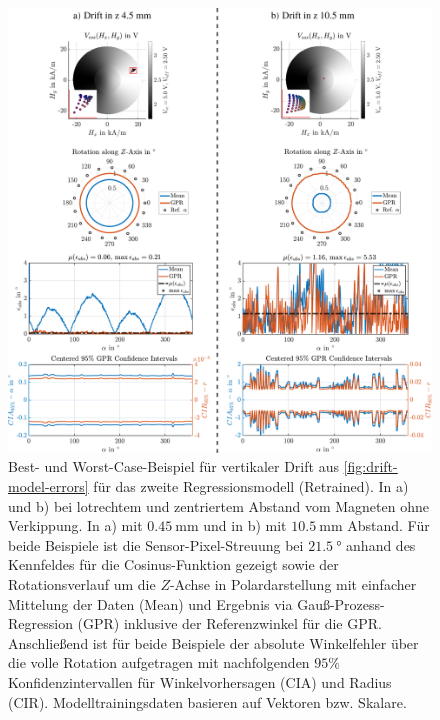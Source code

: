 \clearpage
\begin{figure}[tbph]
	\centering
	\includegraphics[width=\linewidth]{chapters/images/4-EuOExp/Z-Pos-Comp-45-105-Rotation}
	\caption[Best- und Worst-Case-Beispiel bei vertikaler Drift]{Best- und Worst-Case-Beispiel für vertikaler Drift aus \autoref{fig:drift-model-errors} für das zweite Regressionsmodell (Retrained). In a) und b) bei lotrechtem und zentriertem Abstand vom Magneten ohne Verkippung. In a) mit $\SI{0,45}{\milli\metre}$ und in b) mit $\SI{10,5}{\milli\metre}$ Abstand. Für beide Beispiele ist die Sensor-Pixel-Streuung bei $\SI{21,5}{\degree}$ anhand des Kennfeldes für die Cosinus-Funktion gezeigt sowie der Rotationsverlauf um die $Z$-Achse in Polardarstellung mit einfacher Mittelung der Daten (Mean) und Ergebnis via Gauß-Prozess-Regression (GPR) inklusive der Referenzwinkel für die GPR. Anschließend ist für beide Beispiele der absolute Winkelfehler über die volle Rotation aufgetragen mit nachfolgenden $95\%$ Konfidenzintervallen für Winkelvorhersagen (CIA) und Radius (CIR). Modelltrainingsdaten basieren auf Vektoren bzw. Skalare.}
	\label{fig:z-pos-comp-45-105-rotation}
\end{figure}


\clearpage


